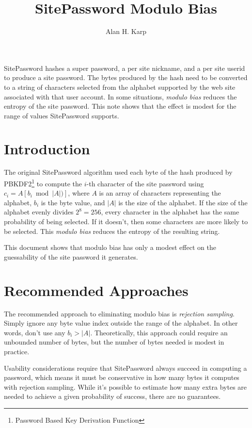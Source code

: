 \documentclass[11pt, oneside]{article}   	%
\title{SitePassword Modulo Bias}
\author{Alan H. Karp}
\begin{document}
\maketitle
\abstract

SitePassword hashes  a super password, a per site nickname, and a per site userid to produce a site password.  The bytes produced by the hash need to be converted to a string of characters selected from the alphabet supported by the web site associated with that user account.  In some situations, {\em modulo bias} reduces the entropy of the site password.  This note shows that the effect is modest for the range of values SitePassword supports.

\section{Introduction}

The original SitePassword algorithm used each byte of the hash produced by PBKDF2\footnote{Password Based Key Derivation Function} to compute the $i$-th character of the site password using $c_i = A[b_i  \bmod  |A|)]$, where $A$ is an array of characters representing the alphabet, $b_i$ is the byte value, and $|A|$ is the size of the alphabet.  If the size of the alphabet evenly divides $2^8 = 256$, every character in the alphabet has the same probability of being selected.  If it doesn't, then some characters are more likely to be selected.  This {\em modulo bias} reduces the entropy of the resulting string.  
 

This document shows that modulo bias has only a modest effect on the guessability of the site password it generates.

\section{Recommended Approaches}

The recommended approach to eliminating modulo bias is {\em rejection sampling}.  Simply ignore any byte value index outside the range of the alphabet.  In other words, don't use any $b_i > |A|$.  Theoretically, this approach could require an unbounded number of bytes, but the number of bytes needed is modest in practice.  

Usability considerations require that SitePassword always succeed in computing a password, which means it must be conservative in how many bytes it computes with rejection sampling.  While it's possible to estimate how many extra bytes are needed to achieve a given probability of success, there are no guarantees.  
\end{document}
